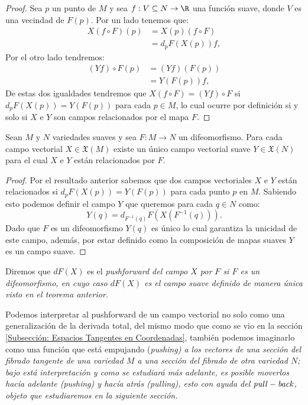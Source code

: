 \begin{proof}
	Sea $p$ un punto de $M$ y sea $f: V \subseteq N \to \R$ una función suave, donde $V$ es una vecindad de $F(p)$. Por un lado tenemos que:
	\begin{align*}
		X(f \circ F)(p) & = X(p)(f \circ F) \\
		                & = d_pF(X(p))f,
	\end{align*}
	Por el otro lado tendremos:
	\begin{align*}
		(Yf) \circ F(p) & = (Yf)(F(p)) \\
		                & = Y(F(p))f,
	\end{align*}
	De estas dos igualdades tendremos que $X(f \circ F) = (Yf)\circ F$ si $d_pF(X(p)) = Y(F(p))$ para cada $p \in M$, lo cual ocurre por definición si y solo si $X$ e $Y$ son campos relacionados por el mapa $F$.
\end{proof}

\begin{theorem}
	Sean $M$ y $N$ variedades suaves y sea $F: M \to N$ un difeomorfismo. Para cada campo vectorial $X \in \mathfrak{X}(M)$ existe un único campo vectorial suave $Y \in \mathfrak{X}(N)$ para el cual $X$ e $Y$ están relacionados por $F$.
\end{theorem}

\begin{proof}
	Por el resultado anterior sabemos que dos campos vectoriales $X$ e $Y$ están relacionados si $d_p F(X(p))= Y(F(p))$ para cada punto $p$ en $M$. Sabiendo esto podemos definir el campo $Y$ que queremos para cada $q \in N$ como:
	\[
		Y(q) = d_{F^{-1}(q)} F ( X (F^{-1}(q))).
	\]
	Dado que $F$ es un difeomorfismo $Y(q)$ es único lo cual garantiza la unicidad de este campo, además, por estar definido como la composición de mapas suaves $Y$ es un campo suave.
\end{proof}

\begin{definition}
  Diremos que $dF(X)$ es el \it{pushforward del campo $X$ por $F$} si $F$ es un difeomorfismo, en cuyo caso $dF(X)$ es el campo suave definido de manera única visto en el teorema anterior.
\end{definition}

Podemos interpretar al pushforward de un campo vectorial no solo como una generalización de la derivada total, del mismo modo que como se vio en la sección \ref{Subsección: Espacios Tangentes en Coordenadas}, también podemos imaginarlo como una función que está empujando (\it{pushing}) a los vectores de una sección del fibrado tangente de una variedad $M$ a una sección del fibrado de otra variedad $N$; bajo está interpretación y como se estudiará más adelante, es posible moverlos hacía adelante (\it{pushing}) y hacía atrás (\it{pulling}), esto con ayuda del $\it{pull-back}$, objeto que estudiaremos en la siguiente sección.
